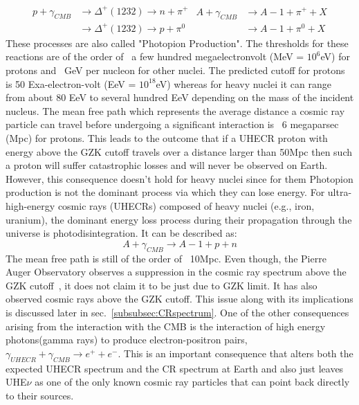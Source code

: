 \begin{equation}\label{eq:GZK}
  \begin{split}
    p + \gamma_{CMB} &\longrightarrow \Delta^+(1232 ) \longrightarrow n+\pi^+ \\ 
                     &\longrightarrow \Delta^+(1232 ) \longrightarrow p+\pi^0
  \end{split} 
  \begin{split}
    A + \gamma_{CMB} &\longrightarrow A-1 + \pi^+ + X \\ 
                     &\longrightarrow A-1 + \pi^0 + X
  \end{split} 
\end{equation}
These processes are also called "Photopion Production". The thresholds for these reactions are of the order of ~a few hundred megaelectronvolt (MeV = $10^6$eV) for protons and ~GeV per nucleon for other nuclei. The predicted cutoff for protons is 50 Exa-electron-volt (EeV = $10^{18}$eV) whereas for heavy nuclei it can range from about 80 EeV to several hundred EeV depending on the mass of the incident nucleus. The mean free path which represents the average distance a cosmic ray particle can travel before undergoing a significant interaction is ~6 megaparsec (Mpc) for protons. This leads to the outcome that if a UHECR proton with energy above the GZK cutoff travels over a distance larger than 50Mpc then such a proton will suffer catastrophic losses and will never be observed on Earth. However, this consequence doesn't hold for heavy nuclei since for them Photopion production is not the dominant process via which they can lose energy. For ultra-high-energy cosmic rays (UHECRs) composed of heavy nuclei (e.g., iron, uranium), the dominant energy loss process during their propagation through the universe is photodisintegration. It can be described as:
\begin{equation}\label{eq:Pdisinteg}
    A + \gamma_{CMB} \longrightarrow A-1 + p + n  
\end{equation}
The mean free path is still of the order of ~10Mpc.
Even though, the Pierre Auger Observatory observes a suppression in the cosmic ray spectrum above the GZK cutoff~\cite{KAMPERT2014318}, it does not claim it to be just due to GZK limit. It has also observed cosmic rays above the GZK cutoff. This issue along with its implications is discussed later in sec.~\ref{subsubsec:CRspectrum}. One of the other consequences arising from the interaction with the CMB is the interaction of high energy photons(gamma rays) to produce electron-positron pairs, $\gamma_{UHECR} + \gamma_{CMB} \longrightarrow e^+ + e^- $. This is an important consequence that alters both the expected UHECR spectrum and the CR spectrum at Earth and also just leaves UHE$\nu$ as one of the only known cosmic ray particles that can point back directly to their sources.

